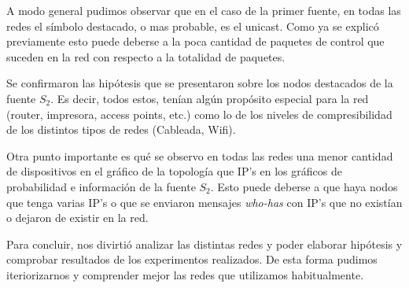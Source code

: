A modo general pudimos observar que en el caso
de la primer fuente, en todas las redes el 
símbolo destacado, o mas probable, es el unicast.
Como ya se explicó previamente esto puede deberse
a la poca cantidad de paquetes de control que suceden
en la red con respecto a la totalidad de paquetes.


Se confirmaron las hipótesis que se presentaron sobre los nodos destacados de
la fuente $S_2$. Es decir, todos estos, tenían algún propósito especial para la
red (router, impresora, access points, etc.) como lo de los niveles
de compresibilidad de los distintos tipos de redes (Cableada, Wifi).


Otra punto importante es qué se observo en todas las redes una
menor cantidad de dispositivos en el gráfico de la topología
que IP's en los gráficos de probabilidad e información de la fuente $S_2$.
Esto puede deberse a que haya nodos que tenga varias IP's
o que se enviaron mensajes \textit{who-has} con IP's que no existían o dejaron
de existir en la red.

Para concluir, nos divirtió analizar las distintas redes y poder elaborar hipótesis
y comprobar resultados de los experimentos realizados. De esta forma pudimos iteriorizarnos
y comprender mejor las redes que utilizamos habitualmente.
